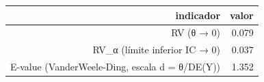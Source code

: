 \begin{tabular}{rr}
\toprule
indicador & valor \\
\midrule
RV (θ → 0) & 0.079 \\
RV\_α (límite inferior IC → 0) & 0.037 \\
E-value (VanderWeele-Ding, escala d = θ/DE(Y)) & 1.352 \\
\bottomrule
\end{tabular}
